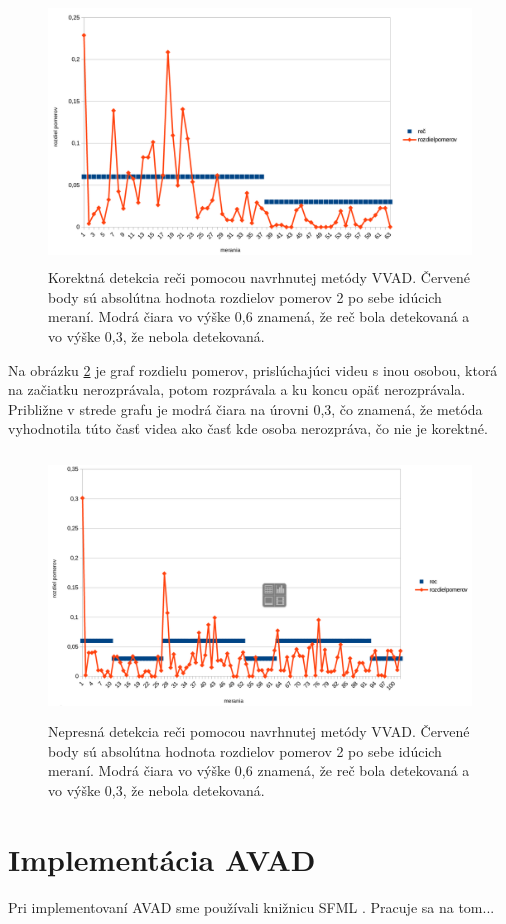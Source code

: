 \begin{figure}[H]
	\begin{center}
		\includegraphics[height=7cm]{pics/spravneRozpoznanie.png}
		\caption{Korektná detekcia reči pomocou navrhnutej metódy VVAD.
		Červené body sú absolútna hodnota rozdielov pomerov 2 po sebe idúcich meraní. 
		Modrá čiara vo výške 0,6 znamená, že reč bola detekovaná a vo výške 0,3, že nebola detekovaná.}
		\label{pic-spravneRozpoznanie}
	\end{center}
\end{figure}

Na obrázku \ref{pic-nespravneRozpoznanie} je graf rozdielu pomerov, prislúchajúci videu s inou osobou, ktorá na začiatku nerozprávala, potom rozprávala a ku koncu opäť nerozprávala. 
Približne v strede grafu je modrá čiara na úrovni 0,3, čo znamená, že metóda vyhodnotila túto časť videa ako časť kde osoba nerozpráva, čo nie je korektné.

\begin{figure}[H]
	\begin{center}
		\includegraphics[height=7cm]{pics/nespravneRozpoznanie.png}
		\caption{Nepresná detekcia reči pomocou navrhnutej metódy VVAD.
		Červené body sú absolútna hodnota rozdielov pomerov 2 po sebe idúcich meraní. 
		Modrá čiara vo výške 0,6 znamená, že reč bola detekovaná a vo výške 0,3, že nebola detekovaná.}
		\label{pic-nespravneRozpoznanie}
	\end{center}
\end{figure}

\section{Implementácia AVAD}
Pri implementovaní AVAD sme používali knižnicu SFML \cite{SFML}.
Pracuje sa na tom...